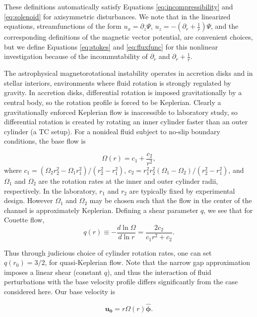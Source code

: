 \documentclass{emulateapj}
\newcommand{\beq}{\begin{equation}}
\newcommand{\eeq}{\end{equation}}
\newcommand{\phihat}{\ensuremath{\mathbf{\hat{\phi}}}}
\begin{document}
These definitions automatically satisfy Equations \ref{eq:incompressibility} and \ref{eq:solenoid} for axisymmetric disturbances. We note that in the linearized equations, streamfunctions of the form $u_x = \partial_z \Psi$, $u_z = -(\partial_r + \frac{1}{r}) \Psi$, and the corresponding definitions of the magnetic vector potential, are convenient choices, but we define Equations \ref{eq:stokes} and \ref{eq:fluxfunc} for this nonlinear investigation because of the incommutability of $\partial_r$ and $\partial_r + \frac{1}{r}$. 

The astrophysical magnetorotational instability operates in accretion disks and in stellar interiors, environments where fluid rotation is strongly regulated by gravity. In accretion disks, differential rotation is imposed gravitationally by a central body, so the rotation profile is forced to be Keplerian. Clearly a gravitationally enforced Keplerian flow is inaccessible to laboratory study, so differential rotation is created by rotating an inner cylinder faster than an outer cylinder (a TC setup). For a nonideal fluid subject to no-slip boundary conditions, the base flow is

\begin{equation}
  \label{eq:couette_flow}
  \Omega(r) = c_1 + \frac{c_2}{r^2},
\end{equation}
where $c_1 = (\Omega_2 r^2_2 - \Omega_1 r^2_1)/(r^2_2 - r^2_1)$, $c_2 = r^2_1 r^2_2 (\Omega_1 - \Omega_2)/(r^2_2 - r^2_1)$, and $\Omega_1$ and $\Omega_2$ are the rotation rates at the inner and outer cylinder radii, respectively. In the laboratory, $r_1$ and $r_2$ are typically fixed by experimental design. However $\Omega_1$ and $\Omega_2$ may be chosen such that the flow in the center of the channel is approximately Keplerian. Defining a shear parameter $q$, we see that for Couette flow,
\begin{equation}
  \label{eq:couette_q}
  q(r) \equiv -\frac{d \ln \Omega}{d \ln r} = \frac{2 c_2}{c_1 r^2 + c_2}.
\end{equation}

Thus through judicious choice of cylinder rotation rates, one can set $q(r_0) = 3/2$, for quasi-Keplerian flow. Note that the narrow gap approximation imposes a linear shear (constant $q$), and thus the interaction of fluid perturbations with the base velocity profile differs significantly from the case considered here. Our base velocity is 

\beq
\label{eq:baseu0}
\mathbf{u_0} = r\Omega(r) \phihat.
\eeq
\end{document}
